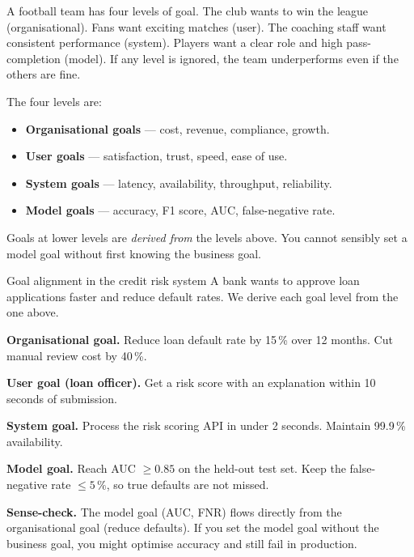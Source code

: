 \documentclass[a4paper,11pt]{article}
\newcommand{\vocab}[1]{\textbf{\color{navy}#1}}
\begin{document}
\begin{everyday}
A football team has four levels of goal.
The club wants to win the league (organisational).
Fans want exciting matches (user).
The coaching staff want consistent performance (system).
Players want a clear role and high pass-completion (model).
If any level is ignored, the team underperforms even if the others are fine.
\end{everyday}

The four levels are:

\begin{itemize}
  \item \vocab{Organisational goals} --- cost, revenue, compliance, growth.
  \item \vocab{User goals} --- satisfaction, trust, speed, ease of use.
  \item \vocab{System goals} --- latency, availability, throughput, reliability.
  \item \vocab{Model goals} --- accuracy, F1 score, AUC, false-negative rate.
\end{itemize}

Goals at lower levels are \emph{derived from} the levels above.
You cannot sensibly set a model goal without first knowing the business goal.

\begin{worked}{Goal alignment in the credit risk system}
A bank wants to approve loan applications faster and reduce default rates.
We derive each goal level from the one above.
\begin{steps}
  \item \textbf{Organisational goal.}
        Reduce loan default rate by 15\,\% over 12 months.
        Cut manual review cost by 40\,\%.
  \item \textbf{User goal (loan officer).}
        Get a risk score with an explanation within 10 seconds of submission.
  \item \textbf{System goal.}
        Process the risk scoring API in under 2 seconds.
        Maintain 99.9\,\% availability.
  \item \textbf{Model goal.}
        Reach AUC $\geq 0.85$ on the held-out test set.
        Keep the false-negative rate $\leq 5\,\%$, so true defaults are not missed.
  \item \textbf{Sense-check.}
        The model goal (AUC, FNR) flows directly from the organisational goal
        (reduce defaults). If you set the model goal without the business goal,
        you might optimise accuracy and still fail in production.
\end{steps}
\end{worked}
\end{document}
